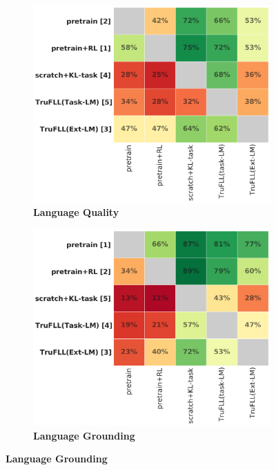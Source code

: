 \documentclass{article}
\begin{document}
\begin{figure}[t!]
\captionsetup[subfigure]{justification=centering}
\begin{subfigure}{.25\textwidth}
  \centering
  \includegraphics[width=0.98\linewidth]{./language_quality_eval.pdf}
  \caption{\small \textbf{Language Quality} \\}
  \label{fig:sfig1}
\end{subfigure}%
\begin{subfigure}{.25\textwidth}
  \centering
  \includegraphics[width=0.98\linewidth]{./question_relevance_eval.pdf}
  \caption{\small \textbf{Language Grounding}}

\end{subfigure}
\end{figure}
\end{document}
